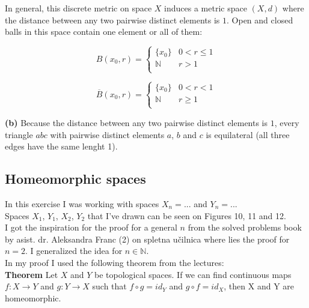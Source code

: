 \documentclass[12pt]{article}
\begin{document}
In general, this discrete metric on space $X$ induces a metric space $(X,d)$ where the distance between any two pairwise distinct elements is $1$. Open and closed balls in this space contain one element or all of them:

\begin{equation*}
	B(x_{0}, r) =
	\begin{cases}
		\{x_{0}\} & 0 < r \leq 1\\
		 \mathbb{N} & r > 1\\
	\end{cases}       
\end{equation*}

\begin{equation*}
	\overline{B}(x_{0}, r) =
	\begin{cases}
		\{x_{0}\} & 0 < r < 1\\
		\mathbb{N} & r \geq 1\\
	\end{cases}       
\end{equation*}

\textbf{(b)} Because the distance between any two pairwise distinct elements is $1$, every triangle $abc$ with pairwise distinct elements $a$, $b$ and $c$ is equilateral (all three edges have the same lenght 1).

\subsection{Homeomorphic spaces} 
In this exercise I was working with spaces $X_{n} = ...$ and $Y_{n}=...$ \\

\noindent Spaces $X_{1}$, $Y_{1}$, $X_{2}$, $Y_{2}$ that I've drawn can be seen on Figures 10, 11 and 12. \\

\noindent I got the inspiration for the proof for a general $n$ from the solved problems book by asist. dr. Aleksandra Franc (2) on spletna učilnica where lies the proof for $n=2$. I generalized the idea for $n \in \mathbb{N}$. \\


\noindent In my proof I used the following theorem from the lectures: \\

\noindent \textbf{Theorem} Let $X$ and $Y$ be topological spaces. If we can find continuous maps $f : X \rightarrow Y$ and $g : Y \rightarrow X$ such that $f \circ g = id_{Y}$ and $g \circ f = id_{X}$, then X and Y are homeomorphic. \\
\end{document}
